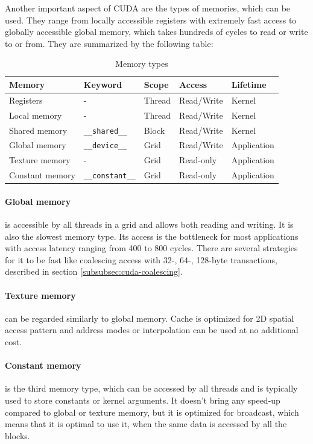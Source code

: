 Another important aspect of CUDA are the types of memories, which can be used. They range from locally accessible registers with extremely fast access to globally accessible global memory, which takes hundreds of cycles to read or write to or from. They are summarized by the following table:

\begin{table}
\centering
\begin{tabular}{| l | l | l | l | l |}
\hline
Memory & Keyword & Scope & Access & Lifetime \\
\hline
Registers & - & Thread & Read/Write & Kernel \\
\hline
Local memory & - & Thread & Read/Write & Kernel \\
\hline
Shared memory & \verb|__shared__| & Block & Read/Write &  Kernel \\
\hline
Global memory & \verb|__device__| & Grid & Read/Write & Application \\
\hline
Texture memory & - & Grid & Read-only & Application \\
\hline
Constant memory & \verb|__constant__| & Grid & Read-only & Application \\
\hline
\end{tabular}
\caption{Memory types}
\end{table}

\paragraph{Global memory} is accessible by all threads in a grid and allows both reading and writing. It is also the slowest memory type. Its access is the bottleneck for most applications with access latency ranging from 400 to 800 cycles. There are several strategies for it to be fast like coalescing access with 32-, 64-, 128-byte transactions, described in section \ref{subsubsec:cuda-coalescing}.

\paragraph{Texture memory} can be regarded similarly to global memory. Cache is optimized for 2D spatial access pattern and address modes or interpolation can be used at no additional cost.

\paragraph{Constant memory} is the third memory type, which can be accessed by all threads and is typically used to store constants or kernel arguments. It doesn't bring any speed-up compared to global or texture memory, but it is optimized for broadcast, which means that it is optimal to use it, when the same data is accessed by all the blocks.

